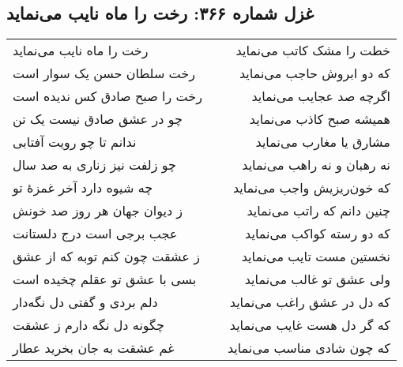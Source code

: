 \begin{center}
\section*{غزل شماره ۳۶۶: رخت را ماه نایب می‌نماید}
\label{sec:366}
\begin{longtable}{l p{0.5cm} r}
رخت را ماه نایب می‌نماید
&&
خطت را مشک کاتب می‌نماید
\\
رخت سلطان حسن یک سوار است
&&
که دو ابروش حاجب می‌نماید
\\
رخت را صبح صادق کس ندیده است
&&
اگرچه صد عجایب می‌نماید
\\
چو در عشق صادق نیست یک تن
&&
همیشه صبح کاذب می‌نماید
\\
ندانم تا چو رویت آفتابی
&&
مشارق یا مغارب می‌نماید
\\
چو زلفت نیز زناری به صد سال
&&
نه رهبان و نه راهب می‌نماید
\\
چه شیوه دارد آخر غمزهٔ تو
&&
که خون‌ریزیش واجب می‌نماید
\\
ز دیوان جهان هر روز صد خونش
&&
چنین دانم که راتب می‌نماید
\\
عجب برجی است درج دلستانت
&&
که دو رسته کواکب می‌نماید
\\
ز عشقت چون کنم توبه که از عشق
&&
نخستین مست تایب می‌نماید
\\
بسی با عشق تو عقلم چخیده است
&&
ولی عشق تو غالب می‌نماید
\\
دلم بردی و گفتی دل نگه‌دار
&&
که دل در عشق راغب می‌نماید
\\
چگونه دل نگه دارم ز عشقت
&&
که گر دل هست غایب می‌نماید
\\
غم عشقت به جان بخرید عطار
&&
که چون شادی مناسب می‌نماید
\\
\end{longtable}
\end{center}
